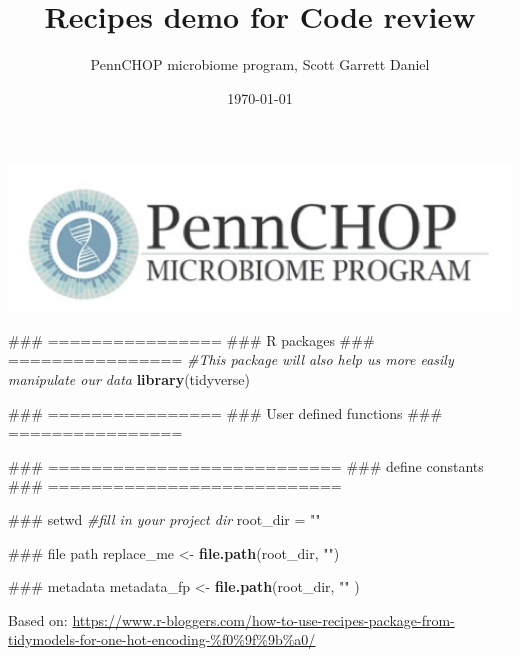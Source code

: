 \documentclass[]{article}
\title{Recipes demo for Code review}
\author{PennCHOP microbiome program, Scott Garrett Daniel}
\date{\today}
\newenvironment{Shaded}{\begin{snugshade}}{\end{snugshade}}
\newcommand{\KeywordTok}[1]{\textcolor[rgb]{0.13,0.29,0.53}{\textbf{#1}}}
\newcommand{\StringTok}[1]{\textcolor[rgb]{0.31,0.60,0.02}{#1}}
\newcommand{\CommentTok}[1]{\textcolor[rgb]{0.56,0.35,0.01}{\textit{#1}}}
\newcommand{\NormalTok}[1]{#1}
\begin{document}
\maketitle

{
\setcounter{tocdepth}{3}
}
\includegraphics{logo_blk.png}\\
\tableofcontents

\begin{Shaded}
\begin{Highlighting}[]
\NormalTok{### ================}
\NormalTok{###   R packages}
\NormalTok{### ================}
\CommentTok{#This package will also help us more easily manipulate our data}
\KeywordTok{library}\NormalTok{(tidyverse)}
\end{Highlighting}
\end{Shaded}

\begin{Shaded}
\begin{Highlighting}[]
\NormalTok{### ================}
\NormalTok{###   User defined functions}
\NormalTok{### ================}
\end{Highlighting}
\end{Shaded}

\begin{Shaded}
\begin{Highlighting}[]
\NormalTok{### ===========================}
\NormalTok{###   define constants}
\NormalTok{### ===========================}

\NormalTok{### setwd}
\CommentTok{#fill in your project dir}
\NormalTok{root_dir =}\StringTok{ ""}

\NormalTok{### file path}
\NormalTok{replace_me <-}\StringTok{ }\KeywordTok{file.path}\NormalTok{(root_dir, }\StringTok{""}\NormalTok{)}

\NormalTok{### metadata}
\NormalTok{metadata_fp <-}\StringTok{ }\KeywordTok{file.path}\NormalTok{(root_dir, }\StringTok{""}\NormalTok{ )}
\end{Highlighting}
\end{Shaded}

Based on:
\url{https://www.r-bloggers.com/how-to-use-recipes-package-from-tidymodels-for-one-hot-encoding-\%f0\%9f\%9b\%a0/}
\end{document}
